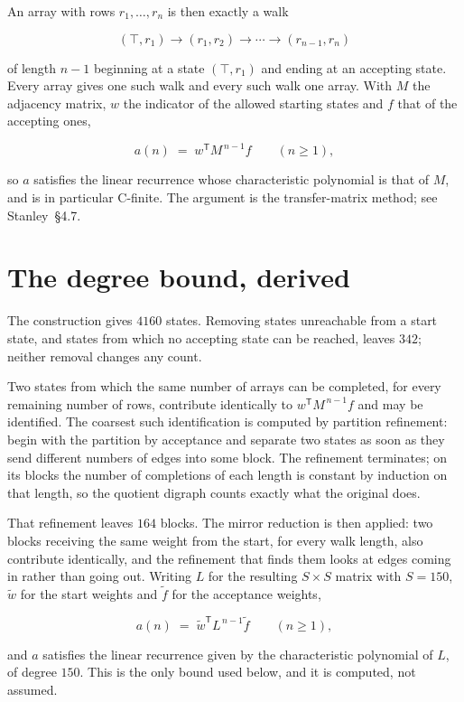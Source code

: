 \documentclass[11pt]{article}
\theoremstyle{definition}
\begin{document}
An array with rows $r_1,\dots,r_n$ is then exactly a walk

\[(\top,r_1) \to (r_1,r_2) \to \cdots \to (r_{n-1},r_n)\]

of length $n-1$ beginning at a state $(\top,r_1)$ and ending at an accepting state. Every array gives one such walk and every such walk one array. With $M$ the adjacency matrix, $w$ the indicator of the allowed starting states and $f$ that of the accepting ones,

\[a(n) \;=\; w^{\mathsf T} M^{\,n-1} f \qquad (n \ge 1),\]

so $a$ satisfies the linear recurrence whose characteristic polynomial is that of $M$, and is in particular C-finite. The argument is the transfer-matrix method; see Stanley~\S4.7.

\section{The degree bound, derived}

The construction gives $4160$ states. Removing states unreachable from a start state, and states from which no accepting state can be reached, leaves $342$; neither removal changes any count.

Two states from which the same number of arrays can be completed, for every remaining number of rows, contribute identically to $w^{\mathsf T}M^{\,n-1}f$ and may be identified. The coarsest such identification is computed by partition refinement: begin with the partition by acceptance and separate two states as soon as they send different numbers of edges into some block. The refinement terminates; on its blocks the number of completions of each length is constant by induction on that length, so the quotient digraph counts exactly what the original does.

That refinement leaves $164$ blocks. The mirror reduction is then applied: two blocks receiving the same weight from the start, for every walk length, also contribute identically, and the refinement that finds them looks at edges coming in rather than going out. Writing $L$ for the resulting $S \times S$ matrix with $S = 150$, $\tilde w$ for the start weights and $\tilde f$ for the acceptance weights,

\[a(n) \;=\; \tilde w^{\mathsf T} L^{\,n-1} \tilde f \qquad (n \ge 1),\]

and $a$ satisfies the linear recurrence given by the characteristic polynomial of $L$, of degree $150$. This is the only bound used below, and it is computed, not assumed.
\end{document}
